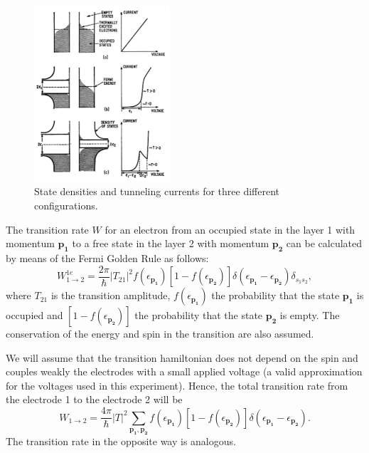 \begin{figure}[h!]
\centering
\includegraphics[width=0.45\textwidth]{fermi_levels}
\caption{\small State densities and tunneling currents for three different configurations.
\label{fermi_levels}}
\end{figure}

The transition rate $W$ for an electron from an occupied state in the layer 1 with momentum $\mathbf{p_1}$ to a free state in the layer 2 with momentum $\mathbf{p_2}$ can be calculated by means of the Fermi Golden Rule as follows:
\begin{equation}\label{probability1}
W_{1\to 2}^{1e} = \frac{2\pi}{\hbar} |T_{21}|^2 f(\epsilon_{\mathbf{p_1}}) [1-f(\epsilon_{\mathbf{p_2}})]
		\delta(\epsilon_{\mathbf{p_1}}-\epsilon_{\mathbf{p_2}})\delta_{s_1s_2},
\end{equation}
where $T_{21}$ is the transition amplitude, $ f(\epsilon_{\mathbf{p_1}})$ the probability that the state $\mathbf{p_1}$ is occupied and  $[1-f(\epsilon_{\mathbf{p_2}})]$ the probability that the state $\mathbf{p_2}$ is empty. The conservation of the energy and spin in the transition are also assumed. 

We will assume that the transition hamiltonian does not depend on the spin and couples weakly the electrodes with a small applied voltage (a valid approximation for the voltages used in this experiment). Hence, the total transition rate from the electrode 1 to the electrode 2 will be
\begin{equation}\label{probability3}
W_{1\to 2} = \frac{4\pi}{\hbar} |T|^2 \sum_{\mathbf{p_1},\mathbf{p_2}}  
		f(\epsilon_{\mathbf{p_1}}) [1-f(\epsilon_{\mathbf{p_2}})] 
		\delta(\epsilon_{\mathbf{p_1}}-\epsilon_{\mathbf{p_2}}).
\end{equation}
The transition rate in the opposite way is analogous.

